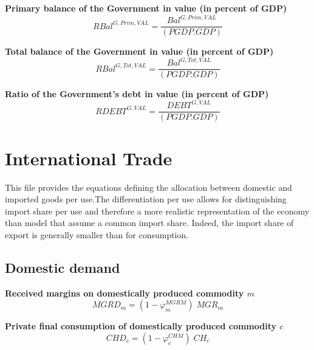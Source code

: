 \documentclass[12pt]{article}
\numberwithin{equation}{section}
\begin{document}
\noindent\textbf{Primary balance of the Government in value (in percent of GDP)} \\
\begin{dmath}
RBal^{G,Prim,VAL} = \frac{Bal^{G,Prim,VAL}}{\left( PGDP . GDP \right)}
\end{dmath}

\noindent\textbf{Total balance of the Government in value (in percent of GDP)} \\
\begin{dmath}
RBal^{G,Tot,VAL} = \frac{Bal^{G,Tot,VAL}}{\left( PGDP . GDP \right)}
\end{dmath}

\noindent\textbf{Ratio of the Government's debt in value (in percent of GDP)} \\
\begin{dmath}
RDEBT^{G,VAL} = \frac{DEBT^{G,VAL}}{\left( PGDP . GDP \right)}
\end{dmath}



\section{International Trade}


This file provides the equations defining the allocation between domestic and imported goods per use.The differentiation per use allows for distinguishing import share per use and therefore a more realistic representation of the economy than model that assume a common import share. Indeed, the import share of export is generally smaller than for consumption.



\subsection{Domestic demand}



\noindent\textbf{Received margins on domestically produced commodity $m$} \\
\begin{dmath}
MGRD_{m} = \left( 1 - \varphi^{MGRM}_{m} \right) \; MGR_{m}
\end{dmath}

\noindent\textbf{Private final consumption of domestically produced commodity $c$} \\
\begin{dmath}
CHD_{c} = \left( 1 - \varphi^{CHM}_{c} \right) \; CH_{c}
\end{dmath}
\end{document}
